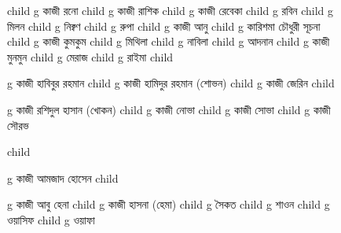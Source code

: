 \documentclass{article}
\begin{document}
\begin{figure}
{\begin{genealogypicture}
{{{{              child{    g{ কাজী রনো  } child{    g{ কাজী রাশিক  }   }   }
              child{    g{ কাজী রেবেকা } 
                  child{    g{ রবিন }   }
                  child{    g{ মিলন }   }
                  child{    g{ নিক্বণ }   }
                  child{    g{ রুপা }   }
              }
              child{    g{ কাজী আনু  } child{    g{ কারিশমা চৌধুরী সূচনা }   }  }
              child{    g{ কাজী কুমকুম  }
                    child{    g{  মিথিলা }   }
                    child{    g{  নাবিলা }   }
                    child{    g{  আদনান }   }
              }
              child{    g{ কাজী মুনমুন }
                  child{    g{  মেরাজ }   }
                  child{    g{  রাইমা }   }
              }
          }
          child{    g{ কাজী হাবিবুর রহমান }  
              child{    g{ কাজী হামিদুর রহমান (শোভন)  }
                  child{ g{ কাজী জেরিন }  }
              }
              child{    g{ কাজী রশিদুল হাসান (খোকন)  }
              child{ g{ কাজী নোভা }  }
              child{ g{ কাজী সোভা }  }
              child{ g{ কাজী সৌরভ }  }

              }
          }
          child{    g{ কাজী আমজাদ হোসেন } 
          child{    g{ কাজী আবু হেনা }
          child{ g{ কাজী হাসনা (হেমা) } 
              child{ g{ সৈকত  }  }
              child{ g{ শাওন  }  }
              child{ g{ ওয়াসিফ  }  }
              child{ g{ ওয়াফা }  }
          }

}}}}}
\end{genealogypicture}}
\end{figure}
\end{document}
